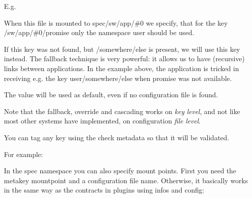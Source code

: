 E.\+g.


\begin{DoxyCode}{0}
\DoxyCodeLine{[promise]}
\end{DoxyCode}



\begin{DoxyEnumerate}
\item When this file is mounted to {\ttfamily spec/sw/app/\#0} we specify, that for the key {\ttfamily /sw/app/\#0/promise} only the namespace {\ttfamily user} should be used.
\item If this key was not found, but {\ttfamily /somewhere/else} is present, we will use this key instead. The {\ttfamily fallback} technique is very powerful\+: it allows us to have (recursive) links between applications. In the example above, the application is tricked in receiving e.\+g. the key {\ttfamily user/somewhere/else} when {\ttfamily promise} was not available.
\item The value {} will be used as default, even if no configuration file is found.
\end{DoxyEnumerate}

Note that the fallback, override and cascading works on {\itshape key level}, and not like most other systems have implemented, on configuration {\itshape file level}.

You can tag any key using the {\ttfamily check} metadata so that it will be validated.

For example\+:


\begin{DoxyCode}{0}
\end{DoxyCode}


In the spec namespace you can also specify mount points. First you need the metakey {\ttfamily mountpoint} and a configuration file name. Otherwise, it basically works in the same way as the contracts in plugins using {\ttfamily infos} and {\ttfamily config}\+:


\begin{DoxyCode}{0}
\DoxyCodeLine{[]}
\end{DoxyCode}



